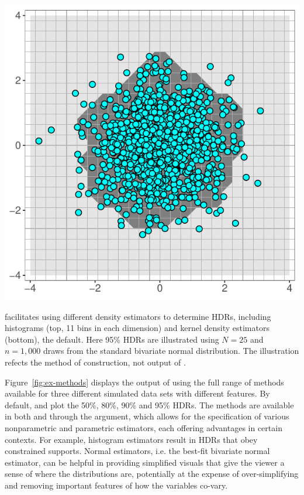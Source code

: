 \begin{widefigure}[h!]
  \includegraphics[scale=.357]{figures/fhat-kde-5.pdf}
  \caption{ facilitates using different density estimators to determine HDRs, including histograms (top, 11 bins in each dimension) and kernel density estimators (bottom), the default. Here 95\% HDRs are illustrated using $N = 25$ and $n = 1,000$ draws from the standard bivariate normal distribution. The illustration refects the method of construction, not output of .}%
  \label{fig:hdr-2d-est}
\end{widefigure}


Figure~\ref{fig:ex-methods} displays the output of  using the full range of methods available for three different simulated data sets with different features.
By default,  and  plot the 50\%, 80\%, 90\% and 95\% HDRs.
The methods are available in both  and  through the  argument, which allows for the specification of various nonparametric and parametric estimators, each offering advantages in certain contexts.
For example, histogram estimators result in HDRs that obey constrained supports.
Normal estimators, i.e. the best-fit bivariate normal estimator, can be helpful in providing simplified visuals that give the viewer a sense of where the distributions are, potentially at the expense of over-simplifying and removing important features of how the variables co-vary.









